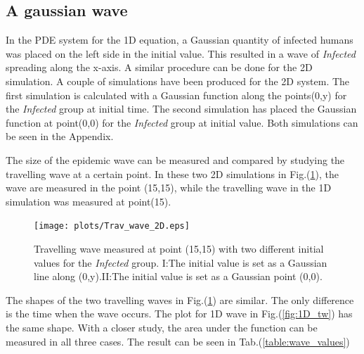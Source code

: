 \documentclass[%
twoside,                 %
final,                   %
10pt]{article}
\begin{document}
\subsection{A gaussian wave}
In the PDE system for the 1D equation, a Gaussian quantity of infected humans was placed on the left side in the initial value. This resulted in a wave of \emph{Infected} spreading along the x-axis. A similar procedure can be done for the 2D simulation. A couple of simulations have been produced for the 2D system. The first simulation is calculated with a Gaussian function along the points(0,y) for the \emph{Infected} group at initial time. The second simulation has placed the Gaussian function at point(0,0) for the \emph{Infected} group at initial value. Both simulations can be seen in the Appendix.  


\vspace{3mm}




\vspace{3mm}


The size of the epidemic wave can be measured and compared by studying the travelling wave at a certain point. In these two 2D simulations in Fig.(\ref{fig:2D_trav_wave}), the wave are measured in the point (15,15), while the travelling wave in the 1D simulation was measured at point(15). 


\begin{figure}[ht]
  \centerline{\texttt{[image: plots/Trav\_wave\_2D.eps]}}
  \caption{
  \label{fig:2D_trav_wave} Travelling wave measured at point (15,15) with two different initial values for the \emph{Infected} group. I:The initial value is set as a Gaussian line along (0,y).II:The initial value is set as a Gaussian point (0,0).
  }
\end{figure}




\vspace{3mm}




\vspace{3mm}


The shapes of the two travelling waves in Fig.(\ref{fig:2D_trav_wave}) are similar. The only difference is the time when the wave occurs. The plot for 1D wave in Fig.(\ref{fig:1D_tw}) has the same shape. With a closer study, the area under the function can be measured in all three cases. The result can be seen in Tab.(\ref{table:wave_values})   

\end{document}
